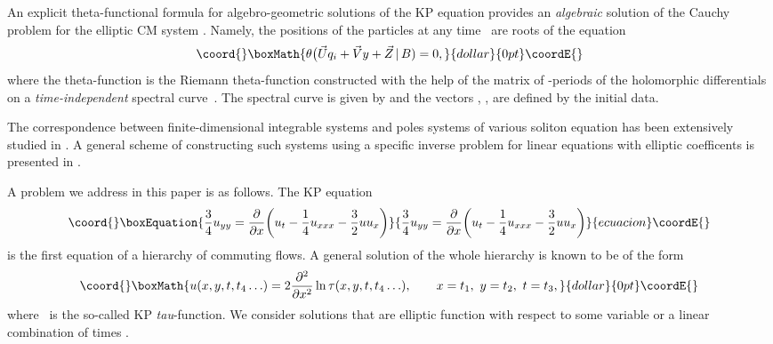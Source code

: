 \documentclass[a4paper,11pt]{article}
\providecommand{\p}{\partial}
\providecommand{\vU}{\Vec{U}}
\providecommand{\vV}{\Vec{V}}
\providecommand{\vZ}{\Vec{Z}}
\theoremstyle{plain}
\theoremstyle{remark}
\begin{document}
An explicit theta-functional formula for algebro-geometric solutions
of the KP equation provides an \emph{algebraic} solution
of the Cauchy problem for the elliptic CM system \cite{krelkp}.
Namely, the positions \coordHE{} of the particles at any time~\coordHE{} are roots of
the equation
$$\coord{}\boxMath{
\theta \bigl(\vU q_i+\vV y+\vZ\,|\,B)=0 ,
}{dollar}{0pt}\coordE{}$$
where the theta-function \coordHE{} is the Riemann theta-function
constructed with the help of the matrix of \coordHE{}-periods of the holomorphic
differentials on a \emph{time-independent} spectral curve~\myHighlight{$\Gamma$}\coordHE{}.
The spectral curve is given by \coordHE{}
and the vectors \myHighlight{$\vU$}\coordHE{}, \myHighlight{$\vV$}\coordHE{}, \myHighlight{$\vZ$}\coordHE{} are defined by the initial data.

The correspondence between finite-dimensional integrable systems and
poles systems of various soliton equation has been extensively studied
in \cite{krbab,krnest,kreltoda,krwz,krzab}. A general scheme of
constructing such systems using a specific inverse problem for
linear equations with elliptic coefficents is presented in \cite{krnest}.

A problem we address in this paper is as follows. The KP equation
\begin{equation}\coord{}\boxEquation{\label{kp}
\frac{3}{4} u_{yy}=\frac{\p}{\p x} \biggl( u_t-\frac{1}{4}u_{xxx}-
\frac{3}{2} u u_x \biggr)
}{\frac{3}{4} u_{yy}=\frac{\p}{\p x} \biggl( u_t-\frac{1}{4}u_{xxx}-
\frac{3}{2} u u_x \biggr)
}{ecuacion}\coordE{}\end{equation}
is the first equation of a hierarchy of commuting flows.
A general solution of the whole hierarchy is known to be of
the form
$$\coord{}\boxMath{
u(x,y,t,t_4\ldots)=2 \frac{\p^2}{\p x^2}\ln\tau(x,y,t,t_4\ldots),
\qquad x=t_1,\ y=t_2,\ t=t_3,
}{dollar}{0pt}\coordE{}$$
where~\myHighlight{$\tau$}\coordHE{} is the so-called KP \emph{tau}-function.
We consider solutions \coordHE{} that are elliptic function with
respect to some variable \coordHE{} or a linear combination of times
\coordHE{}.
\end{document}
